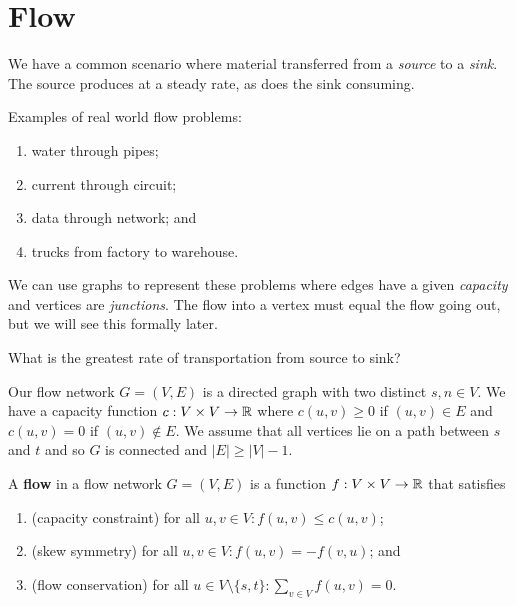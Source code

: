\section{Flow}

We have a common scenario where material transferred from a
\emph{source} to a \emph{sink}.
The source produces at a steady rate, as does the sink consuming.

\begin{example}
    Examples of real world flow problems:
    \begin{enumerate}
        \item water through pipes;
        \item current through circuit;
        \item data through network; and
        \item trucks from factory to warehouse. 
    \end{enumerate}
\end{example}

We can use graphs to represent these problems where edges have a given
\emph{capacity} and vertices are \emph{junctions}.
The flow into a vertex must equal the flow going out,
but we will see this formally later.

\begin{problem}
    What is the greatest rate of transportation from source to sink?
\end{problem}

Our flow network $G = (V,E)$ is a directed graph with two distinct
$s, n \in V$. 
We have a capacity function $c: V \times V \to \mathbb{R}$ where
$c(u, v) \geq 0$ if $(u, v) \in E$ and
$c(u, v) = 0$ if $(u,v) \not\in E$.
We assume that all vertices lie on a path between $s$ and $t$
and so $G$ is connected and $\lvert E \rvert \geq \lvert V \rvert - 1$.

\begin{definition}
    A \textbf{flow} in a flow network $G = (V, E)$
    is a function $f: V \times V \to \mathbb{R}$
    that satisfies
    \begin{enumerate}
        \item (capacity constraint) for all $u,v \in V: f(u,v) \leq c(u,v)$;
        \item (skew symmetry) for all $u,v \in V: f(u,v) = -f(v,u)$; and
        \item (flow conservation) for all $u \in V \setminus \{s, t\}: \sum_{v \in V} f(u,v) = 0$.
    \end{enumerate}
\end{definition}

